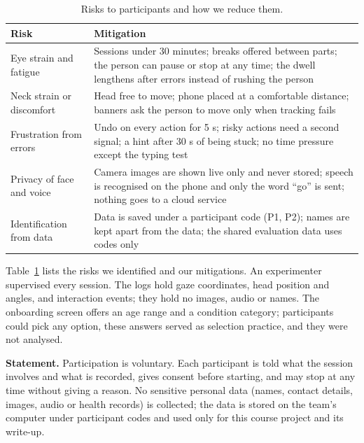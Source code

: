 \documentclass[manuscript,review]{acmart}
\begin{document}
\begin{table}[h]
  \caption{Risks to participants and how we reduce them.}
  \label{tab:risk}
  \small
  \begin{tabularx}{\linewidth}{lX}
    \toprule
    Risk & Mitigation \\
    \midrule
    Eye strain and fatigue & Sessions under 30 minutes; breaks offered between parts; the person
                             can pause or stop at any time; the dwell lengthens after errors instead
                             of rushing the person \\
    Neck strain or discomfort & Head free to move; phone placed at a comfortable distance; banners
                                ask the person to move only when tracking fails \\
    Frustration from errors & Undo on every action for 5 s; risky actions need a second signal; a
                              hint after 30 s of being stuck; no time pressure except the typing test \\
    Privacy of face and voice & Camera images are shown live only and never stored; speech is
                                recognised on the phone and only the word ``go'' is sent; nothing
                                goes to a cloud service \\
    Identification from data & Data is saved under a participant code (P1, P2); names are kept
                                apart from the data; the shared evaluation data uses codes only \\
    \bottomrule
  \end{tabularx}
\end{table}

Table~\ref{tab:risk} lists the risks we identified and our mitigations. An experimenter supervised
every session. The logs hold gaze coordinates, head position and angles, and interaction events;
they hold no images, audio or names. The onboarding screen offers an age range and a condition
category; participants could pick any option, these answers served as selection practice, and they
were not analysed.

\textbf{Statement.} Participation is voluntary. Each participant is told what the session involves
and what is recorded, gives consent before starting, and may stop at any time without giving a
reason. No sensitive personal data (names, contact details, images, audio or health records) is
collected; the data is stored on the team's computer under participant codes and used only for
this course project and its write-up.
\end{document}
